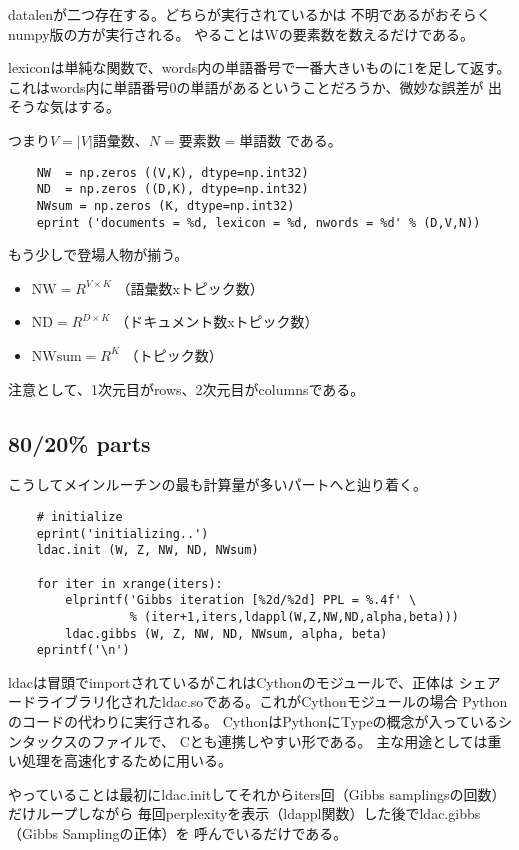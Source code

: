 \documentclass[uplatex]{jsarticle}
\begin{document}
datalenが二つ存在する。どちらが実行されているかは
不明であるがおそらくnumpy版の方が実行される。
やることはWの要素数を数えるだけである。

lexiconは単純な関数で、words内の単語番号で一番大きいものに1を足して返す。
これはwords内に単語番号0の単語があるということだろうか、微妙な誤差が
出そうな気はする。

つまり$V=|V|$語彙数、$N=\mbox{要素数}=\mbox{単語数}$ である。

\begin{lstlisting}
    NW  = np.zeros ((V,K), dtype=np.int32)
    ND  = np.zeros ((D,K), dtype=np.int32)
    NWsum = np.zeros (K, dtype=np.int32)
    eprint ('documents = %d, lexicon = %d, nwords = %d' % (D,V,N))
\end{lstlisting}

もう少しで登場人物が揃う。
\begin{itemize}
\item $\mbox{NW} = R^{V\times K}$ （語彙数xトピック数）
\item $\mbox{ND} = R^{D\times K}$ （ドキュメント数xトピック数）
\item $\mbox{NWsum} = R^K$ （トピック数）
\end{itemize}

注意として、1次元目がrows、2次元目がcolumnsである。

\subsection{80/20\% parts}
こうしてメインルーチンの最も計算量が多いパートへと辿り着く。

\begin{lstlisting}
    # initialize
    eprint('initializing..')
    ldac.init (W, Z, NW, ND, NWsum)

    for iter in xrange(iters):
        elprintf('Gibbs iteration [%2d/%2d] PPL = %.4f' \
                 % (iter+1,iters,ldappl(W,Z,NW,ND,alpha,beta)))
        ldac.gibbs (W, Z, NW, ND, NWsum, alpha, beta)
    eprintf('\n')
\end{lstlisting}

ldacは冒頭でimportされているがこれはCythonのモジュールで、正体は
シェアードライブラリ化されたldac.soである。これがCythonモジュールの場合
Pythonのコードの代わりに実行される。
CythonはPythonにTypeの概念が入っているシンタックスのファイルで、
Cとも連携しやすい形である。
主な用途としては重い処理を高速化するために用いる。

やっていることは最初にldac.initしてそれからiters回（Gibbs samplingsの回数）だけループしながら
毎回perplexityを表示（ldappl関数）した後でldac.gibbs （Gibbs Samplingの正体）を
呼んでいるだけである。
\end{document}
